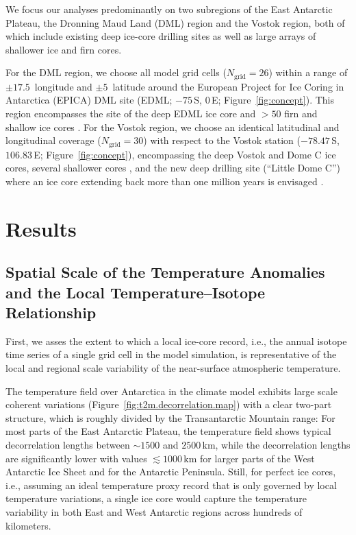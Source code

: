 \documentclass[draft]{agujournal2019}
\begin{document}
We focus our analyses predominantly on two subregions of the East Antarctic
Plateau, the Dronning Maud Land (DML) region and the Vostok region, both of
which include existing deep ice-core drilling sites as well as large arrays of
shallower ice and firn cores.

For the DML region, we choose all model grid cells ($N_{\mathrm{grid}}=26$)
within a range of $\pm17.5$\textdegree\ longitude and $\pm5$\textdegree\
latitude around the European Project for Ice Coring in Antarctica (EPICA) DML
site (EDML; $-75$\textdegree\,S, $0$\textdegree\,E;
Figure~\ref{fig:concept}). This region encompasses the site of the deep EDML ice
core \cite{EPICAcommunitymembers2006,awi2016} and $>50$ firn and shallow ice
cores \cite{Altnau2015}. For the Vostok region, we choose an identical
latitudinal and longitudinal coverage ($N_{\mathrm{grid}}=30$) with respect to
the Vostok station ($-78.47$\textdegree\,S, $106.83$\textdegree\,E;
Figure~\ref{fig:concept}), encompassing the deep Vostok and Dome C ice cores,
several shallower cores \cite{Stenni2017}, and the new deep drilling site
(``Little Dome C'') where an ice core extending back more than one million years
is envisaged \cite{Passalacqua2018}.

\section{Results}\label{results}

\subsection{Spatial Scale of the Temperature Anomalies and the Local
  Temperature--Isotope Relationship}
\label{results:t2m-iso}

First, we asses the extent to which a local ice-core record, i.e., the annual
isotope time series of a single grid cell in the model simulation, is
representative of the local and regional scale variability of the near-surface
atmospheric temperature.

The temperature field over Antarctica in the climate model exhibits large scale
coherent variations (Figure~\ref{fig:t2m.decorrelation.map}) with a clear two-part
structure, which is roughly divided by the Transantarctic Mountain range: For
most parts of the East Antarctic Plateau, the temperature field shows typical
decorrelation lengths between $\sim1500$ and $2500$\,km, while the decorrelation
lengths are significantly lower with values $\lesssim1000$\,km for larger parts
of the West Antarctic Ice Sheet and for the Antarctic Peninsula.  Still, for
perfect ice cores, i.e., assuming an ideal temperature proxy record that is only
governed by local temperature variations, a single ice core would capture the
temperature variability in both East and West Antarctic regions across hundreds
of kilometers.
\end{document}
